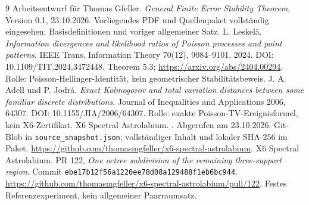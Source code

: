 \documentclass[11pt,a4paper]{article}
\begin{document}
\begin{thebibliography}{9}
 Arbeitsentwurf für Thomas Gfeller. \emph{General Finite Error Stability Theorem}, Version 0.1, 23.10.2026. Vorliegendes PDF und Quellenpaket vollständig eingesehen; Basisdefinitionen und voriger allgemeiner Satz.
 L. Leskelä. \emph{Information divergences and likelihood ratios of Poisson processes and point patterns}. IEEE Trans. Information Theory 70(12), 9084--9101, 2024. DOI: 10.1109/TIT.2024.3472448. Theorem 5.3; \url{https://arxiv.org/abs/2404.00294}. Rolle: Poisson-Hellinger-Identität, kein geometrischer Stabilitätsbeweis.
 J. A. Adell und P. Jodrá. \emph{Exact Kolmogorov and total variation distances between some familiar discrete distributions}. Journal of Inequalities and Applications 2006, 64307. DOI: 10.1155/JIA/2006/64307. Rolle: exakte Poisson-TV-Ereignisformel, kein X6-Zertifikat.
 X6 Spectral Astrolabium. . Abgerufen am 23.10.2026. Git-Blob in \texttt{source\_snapshot.json}; vollständiger Inhalt und lokaler SHA-256 im Paket. \url{https://github.com/thomasmgfeller/x6-spectral-astrolabium}.
 X6 Spectral Astrolabium. PR 122, \emph{One octree subdivision of the remaining three-support region}. Commit \texttt{ebe17b12f56a1220ee78d08a129488f1eb6bc944}. \url{https://github.com/thomasmgfeller/x6-spectral-astrolabium/pull/122}. Festes Referenzexperiment, kein allgemeiner Paarraumsatz.
\end{thebibliography}
\end{document}
